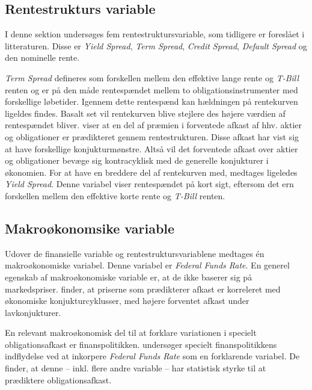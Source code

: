 \documentclass[
  a4paper,
  oneside]{memoir}
\begin{document}
\hypertarget{rentestrukturs-variable}{%
\subsection{Rentestrukturs variable}\label{rentestrukturs-variable}}

I denne sektion undersøges fem rentestruktursvariable, som tidligere er foreslået i litteraturen. Disse er \emph{Yield Spread}, \emph{Term Spread}, \emph{Credit Spread}, \emph{Default Spread} og den nominelle rente.

\emph{Term Spread} defineres som forskellen mellem den effektive lange rente og \emph{T-Bill} renten og er på den måde rentespændet mellem to obligationsinstrumenter med forskellige løbetider. Igennem dette rentespænd kan hældningen på rentekurven ligeldes findes. Basalt set vil rentekurven blive stejlere des højere værdien af rentespændet bliver. \citep{Fama1989} viser at en del af præmien i forventede afkast af hhv. aktier og obligationer er prædikteret gennem rentestrukturen. Disse afkast har vist sig at have forskellige konjukturmønstre. Altså vil det forventede afkast over aktier og obligationer bevæge sig kontracyklisk med de generelle konjukturer i økonomien. For at have en breddere del af rentekurven med, medtages ligeledes \emph{Yield Spread}. Denne variabel viser rentespændet på kort sigt, eftersom det ern forskellen mellem den effektive korte rente og \emph{T-Bill} renten.

\hypertarget{makrouxf8konomsike-variable}{%
\subsection{Makroøkonomsike variable}\label{makrouxf8konomsike-variable}}

Udover de finansielle variable og rentestruktursvariablene medtages én makroøkonomiske variabel. Denne variabel er \emph{Federal Funds Rate}. En generel egenskab af makroøkonomiske variable er, at de ikke baserer sig på markedspriser. \citep{Cochrane2008} finder, at priserne som prædikterer afkast er korreleret med økonomiske konjukturcyklusser, med højere forventet afkast under lavkonjukturer.

En relevant makroøkonomisk del til at forklare variationen i specielt obligationsafkast er finanspolitikken. \citep{Dai2005} undersøger specielt finanspolitikkens indflydelse ved at inkorpere \emph{Federal Funds Rate} som en forklarende variabel. De finder, at denne -- inkl. flere andre variable -- har statistisk styrke til at prædiktere obligationsafkast.
\end{document}
